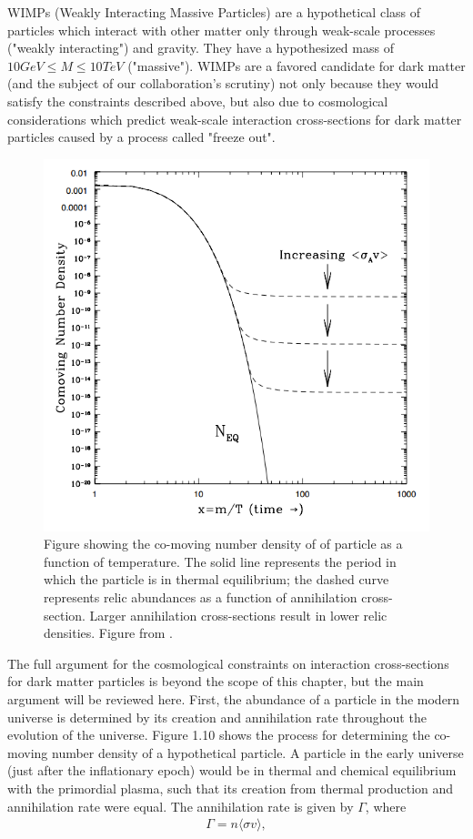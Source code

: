 \documentclass{report}
\begin{document}
WIMPs (Weakly Interacting Massive Particles) are a hypothetical class of particles which interact with other matter only through weak-scale processes ("weakly interacting") and gravity. They have a hypothesized mass of $10GeV \leq M \leq 10TeV$ ("massive"). WIMPs are a favored candidate for dark matter (and the subject of our collaboration's scrutiny) not only because they would satisfy the constraints described above, but also due to cosmological considerations which predict weak-scale interaction cross-sections for dark matter particles caused by a process called "freeze out".

\begin{figure}[h]
\centering
\includegraphics[width = .4\textwidth]{annihilation_crosssection.png}
\caption{Figure showing the co-moving number density of of particle as a function of temperature. The solid line represents the period in which the particle is in thermal equilibrium; the dashed curve represents relic abundances as a function of annihilation cross-section. Larger annihilation cross-sections result in lower relic densities. Figure from \cite{Kolb1990}.}
\end{figure}

The full argument for the cosmological constraints on interaction cross-sections for dark matter particles is beyond the scope of this chapter, but the main argument will be reviewed here. First, the abundance of a particle in the modern universe is determined by its creation and annihilation rate throughout the evolution of the universe. Figure 1.10 shows the process for determining the co-moving number density of a hypothetical particle. A particle in the early universe (just after the inflationary epoch) would be in thermal and chemical equilibrium with the primordial plasma, such that its creation from thermal production and annihilation rate were equal. The annihilation rate is given by $\Gamma$, where
\begin{eqnarray}
\Gamma = n\langle \sigma v \rangle ,
\end{eqnarray}
\end{document}
